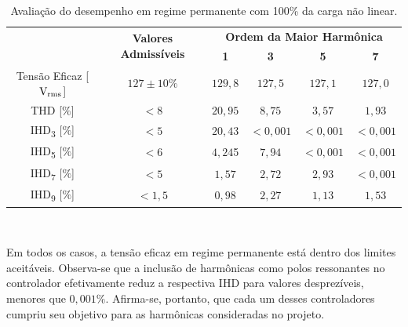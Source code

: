 \documentclass[repeatfields,oneside]{tcc}
\begin{document}
\begin{table}[h]
    \centering
    \caption{Avaliação do desempenho em regime permanente com 100\% da carga não linear.}
    \begin{tabular}{c|c|c|c|c|c}
                                                      & \multirow{2}{0.18\linewidth}{\centering\textbf{Valores Admissíveis}} & \multicolumn{4}{c}{\textbf{Ordem da Maior Harmônica}} \\
                                                      &                                                                      & \textbf{1} & \textbf{3} & \textbf{5} & \textbf{7}     \\\hline
        Tensão Eficaz [$\text{V\textsubscript{rms}}$] & $127 \pm 10\%$                                                       & $129,8$    & $127,5$    & $127,1$    & $127,0$        \\\hline
        THD [$\%$]                                    & $<8$                                                                 & $20,95$    & $8,75$     & $3,57$     & $1,93$         \\\hline
        IHD\textsubscript{3} [$\%$]                   & $<5$                                                                 & $20,43$    & $<0,001$   & $< 0,001$  & $< 0,001$      \\\hline
        IHD\textsubscript{5} [$\%$]                   & $<6$                                                                 & $4,24$5    & $7,94$     & $< 0,001$  & $< 0,001$      \\\hline
        IHD\textsubscript{7} [$\%$]                   & $<5$                                                                 & $1,57$     & $2,72$     & $2,93$     & $< 0,001$      \\\hline
        IHD\textsubscript{9} [$\%$]                   & $<1,5$                                                               & $0,98$     & $2,27$     & $1,13$     & $1,53$         \\
    \end{tabular}
    \\\vspace{0.25cm}
    \label{tab:harm}
\end{table}

Em todos os casos, a tensão eficaz em regime permanente está dentro dos limites aceitáveis.
Observa-se que a inclusão de harmônicas como polos ressonantes no controlador efetivamente reduz a respectiva IHD para valores desprezíveis, menores que $0,001\%$.
Afirma-se, portanto, que cada um desses controladores cumpriu seu objetivo para as harmônicas consideradas no projeto.
\end{document}
